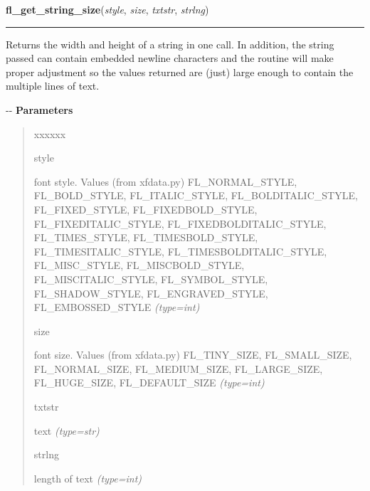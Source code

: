 \hspace{.8\funcindent}\begin{boxedminipage}{\funcwidth}

    \raggedright \textbf{fl\_get\_string\_size}(\textit{style}, \textit{size}, \textit{txtstr}, \textit{strlng})

    \vspace{-1.5ex}

    \rule{\textwidth}{0.5\fboxrule}
\setlength{\parskip}{2ex}

Returns the width and height of a string in one call. In addition, the
string passed can contain embedded newline characters and the routine will
make proper adjustment so the values returned are (just) large enough to
contain the multiple lines of text.

-{}-
\setlength{\parskip}{1ex}
      \textbf{Parameters}
      \vspace{-1ex}

      \begin{quote}
        \begin{Ventry}{xxxxxx}

          \item[style]


font style. Values (from xfdata.py) FL\_NORMAL\_STYLE, FL\_BOLD\_STYLE,
FL\_ITALIC\_STYLE, FL\_BOLDITALIC\_STYLE, FL\_FIXED\_STYLE,
FL\_FIXEDBOLD\_STYLE, FL\_FIXEDITALIC\_STYLE, FL\_FIXEDBOLDITALIC\_STYLE,
FL\_TIMES\_STYLE, FL\_TIMESBOLD\_STYLE, FL\_TIMESITALIC\_STYLE,
FL\_TIMESBOLDITALIC\_STYLE, FL\_MISC\_STYLE, FL\_MISCBOLD\_STYLE,
FL\_MISCITALIC\_STYLE, FL\_SYMBOL\_STYLE, FL\_SHADOW\_STYLE,
FL\_ENGRAVED\_STYLE, FL\_EMBOSSED\_STYLE
            {\it (type=int)}

          \item[size]


font size. Values (from xfdata.py) FL\_TINY\_SIZE, FL\_SMALL\_SIZE,
FL\_NORMAL\_SIZE, FL\_MEDIUM\_SIZE, FL\_LARGE\_SIZE, FL\_HUGE\_SIZE,
FL\_DEFAULT\_SIZE
            {\it (type=int)}

          \item[txtstr]


text
            {\it (type=str)}

          \item[strlng]


length of text
            {\it (type=int)}

        \end{Ventry}

      \end{quote}


\end{boxedminipage}
